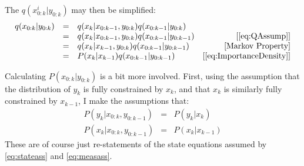 The $q(x^i_{0:k} | y_{0:k})$ may then be simplified:
\begin{equation}
\begin{array}{cclr}
q(x_{0:k} | y_{0:k}) & = & q(x_k | x_{0:k-1}, y_{0:k})q(x_{0:k-1} | y_{0:k}) &  \\
& = & q(x_k | x_{0:k-1}, y_{0:k})q(x_{0:k-1} | y_{0:k-1})  & \text{[\autoref{eq:QAssump}]} \\
& = & q(x_k | x_{k-1}, y_{0:k})q(x_{0:k-1} | y_{0:k-1})  & \text{[Markov Property]}\\
& = & P(x_k | x_{k-1})q(x_{0:k-1} | y_{0:k-1})  & \text{[\autoref{eq:ImportanceDensity}]}
\end{array}
\end{equation}

Calculating $P(x_{0:k} | y_{0:k})$ is a bit more involved. 
First, using the assumption that the distribution of $y_k$ is 
fully constrained by $x_k$, and that $x_k$ is similarly fully 
constrained by $x_{k-1}$, I make the assumptions that:
\begin{eqnarray}
P(y_k | x_{0:k}, y_{0:k-1}) &=& P(y_k | x_k) \nonumber \\
P(x_k | x_{0:k}, y_{0:k-1}) &=& P(x_k | x_{k-1})
\label{eq:MarkovProperty}
\end{eqnarray}
These are of course just re-statements of the state equations assumed 
by \autoref{eq:stateass} and \autoref{eq:measass}.

